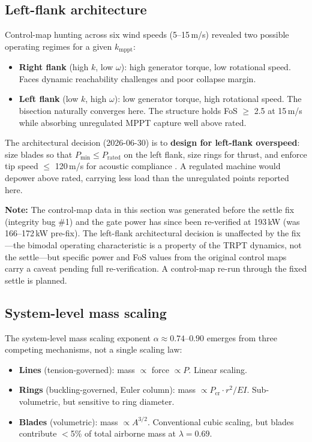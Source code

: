\documentclass[11pt,a4paper]{article}
\begin{document}
\subsection{Left-flank architecture}

Control-map hunting across six wind speeds (5--15\,m/s) revealed two possible operating regimes for a given $k_{\text{mppt}}$:

\begin{itemize}
\item \textbf{Right flank} (high $k$, low $\omega$): high generator torque, low rotational speed. Faces dynamic reachability challenges and poor collapse margin.
\item \textbf{Left flank} (low $k$, high $\omega$): low generator torque, high rotational speed. The bisection naturally converges here. The structure holds FoS $\geq$ 2.5 at 15\,m/s while absorbing unregulated MPPT capture well above rated.
\end{itemize}

The architectural decision (2026-06-30) is to \textbf{design for left-flank overspeed}: size blades so that $P_{\text{min}} \leq P_{\text{rated}}$ on the left flank, size rings for thrust, and enforce tip speed $\leq$ 120\,m/s for acoustic compliance \cite{ktd_decisions2026}.
A regulated machine would depower above rated, carrying less load than the unregulated points reported here.

\textbf{Note:} The control-map data in this section was generated before the settle fix (integrity bug \#1) and the gate power has since been re-verified at 193\,kW (was 166--172\,kW pre-fix).
The left-flank architectural decision is unaffected by the fix---the bimodal operating characteristic is a property of the TRPT dynamics, not the settle---but specific power and FoS values from the original control maps carry a caveat pending full re-verification.
A control-map re-run through the fixed settle is planned.

\subsection{System-level mass scaling}

The system-level mass scaling exponent $\alpha \approx 0.74$--$0.90$ emerges from three competing mechanisms, not a single scaling law:

\begin{itemize}
\item \textbf{Lines} (tension-governed): mass $\propto$ force $\propto P$. Linear scaling.
\item \textbf{Rings} (buckling-governed, Euler column): mass $\propto P_{\text{cr}} \cdot r^2 / EI$. Sub-volumetric, but sensitive to ring diameter.
\item \textbf{Blades} (volumetric): mass $\propto A^{3/2}$. Conventional cubic scaling, but blades contribute $<$5\% of total airborne mass at $\lambda = 0.69$.
\end{itemize}
\end{document}
